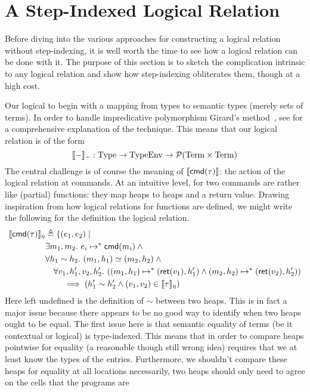 \section{A Step-Indexed Logical Relation}

Before diving into the various approaches for constructing a logical
relation without step-indexing, it is well worth the time to see how
a logical relation can be done with it. The purpose of this section is
to sketch the complication intrinsic to any logical relation and show
how step-indexing obliterates them, though at a high cost.

Our logical to begin with a mapping from types to semantic types
(merely sets of terms). In order to handle impredicative polymorphism
Girard's method~\citep{Girard:71,Girard:72}, see \citet{TODO-PFPL} for
a comprehensive explanation of the technique. This means that our
logical relation is of the form
\[
  \llbracket - \rrbracket_{-} : \mathrm{Type} \to \mathrm{TypeEnv} \to \mathcal{P}(\mathrm{Term} \times \mathrm{Term})
\]
The central challenge is of course the meaning of $\llbracket \mathsf{cmd}(\tau) \rrbracket$:
the action of the logical relation at commands. At an intuitive level,
for two commands are rather like (partial) functions: they map heaps to heaps
and a return value. Drawing inspiration from how logical relations for
functions are defined, we might write the following for the definition
the logical relation.
\begin{align*}
  \llbracket \mathsf{cmd}(\tau) \rrbracket_\eta& \triangleq \{(e_1, e_2) \mid\\
  &\exists m_1, m_2.\ e_i \mapsto^* \mathsf{cmd}(m_i) \land{}\\
  &\forall h_1 \sim h_2.
  \ (m_1, h_1) \simeq (m_2, h_2) \land{}\\
  &\quad \forall v_1, h_1', v_2, h_2'.
  \ ((m_1, h_1) \mapsto^* (\mathsf{ret}(v_1), h_1') \land (m_2, h_2) \mapsto^* (\mathsf{ret}(v_2), h_2'))\\
  &\qquad \implies (h_1' \sim h_2' \land (v_1, v_2) \in \llbracket \tau \rrbracket_\eta)
\end{align*}
Here left undefined is the definition of $\sim$ between two
heaps. This is in fact a major issue because there appears to be no
good way to identify when two heaps ought to be equal. The first issue
here is that semantic equality of terms (be it contextual or logical)
is type-indexed. This means that in order to compare heaps pointwise
for equality (a reasonable though still wrong idea) requires that we
at least know the types of the entries. Furthermore, we shouldn't
compare these heaps for equality at all locations necessarily, two
heaps should only need to agree on the cells that the programs are
